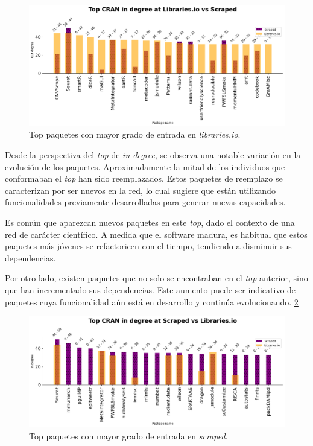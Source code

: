 \begin{figure}[h!]
    \begin{center}
        \includegraphics[width=1\textwidth]{img/cran/top_ind_libio.png}
        \caption{Top paquetes con mayor grado de entrada en \textit{libraries.io}.}
        \label{fig:top_ind_libio_cran}
    \end{center}
\end{figure}


Desde la perspectiva del \textit{top} de \textit{in degree}, se observa una notable variación en
la evolución de los paquetes. Aproximadamente la mitad de los individuos que conformaban el
\textit{top} han sido reemplazados. Estos paquetes de reemplazo se caracterizan por ser nuevos
en la red, lo cual sugiere que están utilizando funcionalidades previamente desarrolladas para
generar nuevas capacidades.

Es común que aparezcan nuevos paquetes en este \textit{top}, dado el contexto de una red de
carácter científico. A medida que el software madura, es habitual que estos paquetes más
jóvenes se refactoricen con el tiempo, tendiendo a disminuir sus dependencias.

Por otro lado, existen paquetes que no solo se encontraban en el \textit{top} anterior,
sino que han incrementado sus dependencias. Este aumento puede ser indicativo de paquetes
cuya funcionalidad aún está en desarrollo y continúa evolucionando. \ref{fig:top_ind_scraped_cran}

\begin{figure}[h!]
    \begin{center}
        \includegraphics[width=1\textwidth]{img/cran/top_ind_scraped.png}
        \caption{Top paquetes con mayor grado de entrada en \textit{scraped}.}
        \label{fig:top_ind_scraped_cran}
    \end{center}
\end{figure}


